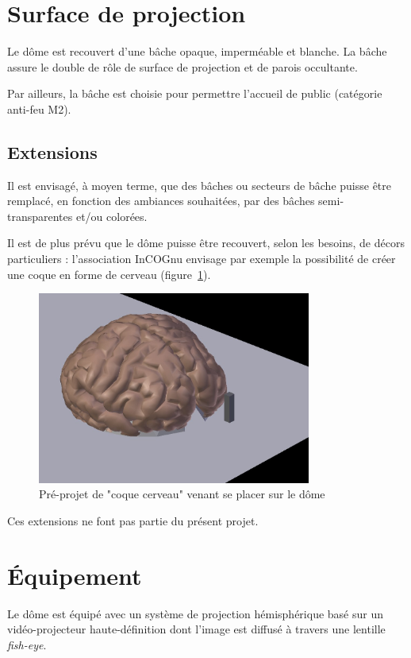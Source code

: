 \documentclass[a4paper,12pt]{report}
\begin{document}
\section{Surface de projection}

Le dôme est recouvert d'une bâche opaque, imperméable et blanche.  La bâche
assure le double de rôle de surface de projection et de parois occultante.

Par ailleurs, la bâche est choisie pour permettre l'accueil de public
(catégorie anti-feu M2).

\subsection*{Extensions}

Il est envisagé, à moyen terme, que des bâches ou secteurs de bâche puisse être
remplacé, en fonction des ambiances souhaitées, par des bâches
semi-transparentes et/ou colorées.

Il est de plus prévu que le dôme puisse être recouvert, selon les besoins, de décors
particuliers : l'association InCOGnu envisage par exemple la possibilité de
créer une coque en forme de cerveau (figure~\ref{coque_cerveau}).

\begin{figure}[!h]
\centering
\includegraphics[width=9cm]{coque_cerveau.jpg}
\caption{Pré-projet de "coque cerveau" venant se placer sur le dôme}
\label{coque_cerveau}
\end{figure}

Ces extensions ne font pas partie du présent projet.

\section{Équipement}

Le dôme est équipé avec un système de projection hémisphérique basé sur un
vidéo-projecteur haute-définition dont l'image est diffusé à travers une
lentille {\it fish-eye}.
\end{document}

